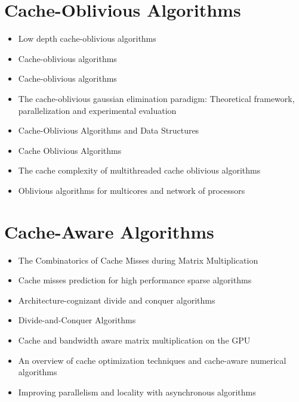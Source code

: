 \section*{Cache-Oblivious Algorithms}
\label{sec:lr-cache-oblivious-algorithms}

\begin{itemize}
\item Low depth cache-oblivious algorithms \cite{Blelloch2009}
\item Cache-oblivious algorithms \cite{Frigo1999}
\item Cache-oblivious algorithms \cite{Prokop1999}
\item The cache-oblivious gaussian elimination paradigm: Theoretical
  framework, parallelization and experimental evaluation
  \cite{Chowdhury2007}
\item Cache-Oblivious Algorithms and Data Structures
  \cite{Demaine2002}
\item Cache Oblivious Algorithms \cite{Kumar2003}
\item The cache complexity of multithreaded cache oblivious algorithms
  \cite{Frigo2009}
\item Oblivious algorithms for multicores and network of processors
  \cite{Chowdhury2009}
\end{itemize}


\section*{Cache-Aware Algorithms}
\label{sec:lr-cache-aware-algorithms}

\begin{itemize}
\item The Combinatorics of Cache Misses during Matrix Multiplication
  \cite{Chatterjee2000}
\item Cache misses prediction for high performance sparse algorithms
  \cite{Fraguela1998}
\item Architecture-cognizant divide and conquer algorithms
  \cite{Gatlin1999}
\item Divide-and-Conquer Algorithms \cite{Gurari2010}
\item Cache and bandwidth aware matrix multiplication on the GPU
  \cite{Hall2001}
\item An overview of cache optimization techniques and cache-aware
  numerical algorithms \cite{Kowarschik2003}
\item Improving parallelism and locality with asynchronous algorithms
  \cite{Liu2010}
\end{itemize}


